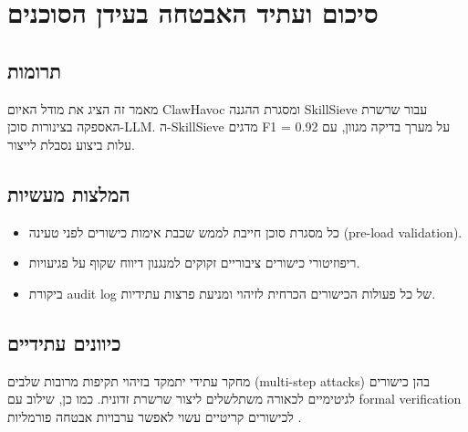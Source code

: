 
\clearpage
\chapter{סיכום ועתיד האבטחה בעידן הסוכנים}

\section{תרומות}

מאמר זה הציג את מודל האיום \textenglish{ClawHavoc} ומסגרת ההגנה \textenglish{SkillSieve} עבור שרשרת האספקה בצינורות סוכן-\textenglish{LLM}. ה-\textenglish{SkillSieve} מדגים \textenglish{F1 = 0.92} על מערך בדיקה מגוון, עם עלות ביצוע נסבלת לייצור.

\section{המלצות מעשיות}

\begin{itemize}
\item כל מסגרת סוכן חייבת לממש שכבת אימות כישורים לפני טעינה (\textenglish{pre-load validation}).
\item ריפוזיטורי כישורים ציבוריים זקוקים למנגנון דיווח שקוף על פגיעויות.
\item ביקורת \textenglish{audit log} של כל פעולות הכישורים הכרחית לזיהוי ומניעת פרצות עתידיות.
\end{itemize}

\section{כיוונים עתידיים}

מחקר עתידי יתמקד בזיהוי תקיפות מרובות שלבים (\textenglish{multi-step attacks}) בהן כישורים לגיטימיים לכאורה משתלשלים ליצור שרשרת זדונית. כמו כן, שילוב עם \textenglish{formal verification} לכישורים קריטיים עשוי לאפשר ערבויות אבטחה פורמליות \cite{weidinger2021ethical}.
